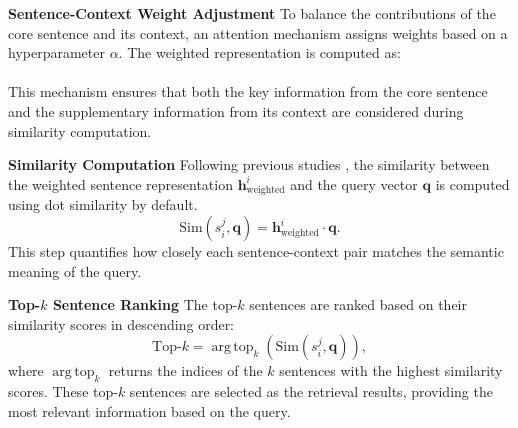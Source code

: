 \textbf{Sentence-Context Weight Adjustment} 
To balance the contributions of the core sentence and its context, an attention mechanism assigns weights based on a hyperparameter $\alpha$. The weighted representation is computed as: 
\\[\bigskipamount]
\\[\bigskipamount]
This mechanism ensures that both the key information from the core sentence and the supplementary information from its context are considered during similarity computation.





\textbf{Similarity Computation}
Following previous studies \cite{lewisRetrievalaugmentedGenerationKnowledgeintensive2020, zouPoisonedRAGKnowledgeCorruption2024}, the similarity between the weighted sentence representation $\mathbf{h}_{\text{weighted}}^i$ and the query vector $\mathbf{q}$ is computed using dot similarity by default.
    \[
    \text{Sim}(s_i^j, \mathbf{q}) = \mathbf{h}_{\text{weighted}}^i \cdot \mathbf{q}.
    \]
This step quantifies how closely each sentence-context pair matches the semantic meaning of the query.

\textbf{Top-$k$ Sentence Ranking} 
The top-$k$ sentences are ranked based on their similarity scores in descending order:
\[
\text{Top-}k = \operatorname{arg\,top}_k \left( \text{Sim}(s_i^j, \mathbf{q}) \right),
\]
where $\operatorname{arg\,top}_k$ returns the indices of the $k$ sentences with the highest similarity scores. These top-$k$ sentences are selected as the retrieval results, providing the most relevant information based on the query.

